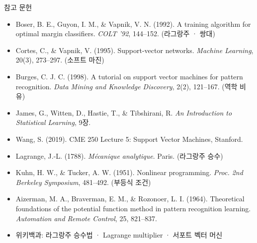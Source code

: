 \documentclass[aspectratio=169,11pt,t]{beamer}
\newcommand{\paperlink}[1]{\href{#1}{\textcolor{ksablue}{\faLink}}}
\begin{document}
\begin{frame}{참고 문헌}
\vfill
\scriptsize
\begin{itemize}
\setlength{\itemsep}{0.25em}
\item Boser, B. E., Guyon, I. M., \& Vapnik, V. N. (1992). A training algorithm for optimal margin classifiers. \textit{COLT '92}, 144--152. \;(라그랑주 · 쌍대) \paperlink{https://doi.org/10.1145/130385.130401}
\item Cortes, C., \& Vapnik, V. (1995). Support-vector networks. \textit{Machine Learning}, 20(3), 273--297. \;(소프트 마진) \paperlink{https://doi.org/10.1007/BF00994018}
\item Burges, C. J. C. (1998). A tutorial on support vector machines for pattern recognition. \textit{Data Mining and Knowledge Discovery}, 2(2), 121--167. \;(역학 비유) \paperlink{https://doi.org/10.1023/A:1009715923555}
\item James, G., Witten, D., Hastie, T., \& Tibshirani, R. \textit{An Introduction to Statistical Learning}, 9장. \paperlink{https://doi.org/10.1007/978-1-0716-1418-1}
\item Wang, S. (2019). CME 250 Lecture 5: Support Vector Machines, Stanford. \paperlink{https://web.stanford.edu/class/cme250/files/cme250_lecture5.pdf}
\item Lagrange, J.-L. (1788). \textit{Mécanique analytique}. Paris. \;(라그랑주 승수)
\item Kuhn, H. W., \& Tucker, A. W. (1951). Nonlinear programming. \textit{Proc. 2nd Berkeley Symposium}, 481--492. \;(부등식 조건) \paperlink{https://projecteuclid.org/euclid.bsmsp/1200500249}
\item Aizerman, M. A., Braverman, E. M., \& Rozonoer, L. I. (1964). Theoretical foundations of the potential function method in pattern recognition learning. \textit{Automation and Remote Control}, 25, 821--837.
\item 위키백과: 라그랑주 승수법 \paperlink{https://ko.wikipedia.org/wiki/\%EB\%9D\%BC\%EA\%B7\%B8\%EB\%9E\%91\%EC\%A3\%BC_\%EC\%8A\%B9\%EC\%88\%98\%EB\%B2\%95} \;·\; Lagrange multiplier \paperlink{https://en.wikipedia.org/wiki/Lagrange_multiplier} \;·\; 서포트 벡터 머신 \paperlink{https://ko.wikipedia.org/wiki/\%EC\%84\%9C\%ED\%8F\%AC\%ED\%8A\%B8_\%EB\%B2\%A1\%ED\%84\%B0_\%EB\%A8\%B8\%EC\%8B\%A0}
\end{itemize}
\vfill
{}
\end{frame}
\end{document}
